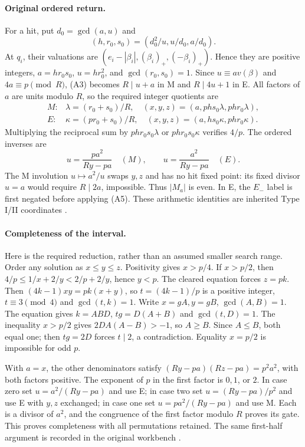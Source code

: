 \paragraph{Original ordered return.}
For a hit, put $d_0=\gcd(a,u)$ and
\[
 (h,r_0,s_0)=(d_0^2/u,u/d_0,a/d_0).
\]
At $q_i$, their valuations are
$(e_i-|\beta_i|,(\beta_i)_+,(-\beta_i)_+)$. Hence they are positive
integers, $a=hr_0s_0$, $u=hr_0^2$, and $\gcd(r_0,s_0)=1$.
Since $u\equiv av(\beta)$ and $4a\equiv p\pmod R$, (A3) becomes
$R\mid u+a$ in M and $R\mid4u+1$ in E. All factors of $a$ are units
modulo $R$, so the required integer quotients are
\[
 \begin{array}{ll}
 M:&\lambda=(r_0+s_0)/R,\quad (x,y,z)=(a,phs_0\lambda,phr_0\lambda),\\
 E:&\kappa=(pr_0+s_0)/R,\quad (x,y,z)=(a,hs_0\kappa,phr_0\kappa).
 \end{array}                                                   \tag{A5}
\]
Multiplying the reciprocal sum by $phr_0s_0\lambda$ or
$phr_0s_0\kappa$ verifies $4/p$. The ordered inverses are
\[
 u=\frac{pa^2}{Ry-pa}\quad(M),\qquad
 u=\frac{a^2}{Ry-pa}\quad(E).                              \tag{A6}
\]
The M involution $u\mapsto a^2/u$ swaps $y,z$ and has no hit fixed point:
its fixed divisor $u=a$ would require $R\mid2a$, impossible. Thus $|M_a|$
is even. In E, the $E_-$ label is first negated before applying (A5).
These arithmetic identities are inherited Type I/II coordinates
\cite[\S2, Propositions 2.2 and 2.6]{ET}.

\paragraph{Completeness of the interval.}
Here is the required reduction, rather than an assumed smaller search range.
Order any solution as $x\le y\le z$. Positivity gives $x>p/4$.
If $x>p/2$, then $4/p\le1/x+2/y<2/p+2/y$, hence $y<p$.
The cleared equation forces $z=pk$. Then $(4k-1)xy=pk(x+y)$,
so $t=(4k-1)/p$ is a positive integer, $t\equiv3\pmod4$ and
$\gcd(t,k)=1$. Write $x=gA,y=gB$, $\gcd(A,B)=1$.
The equation gives $k=ABD$, $tg=D(A+B)$ and $\gcd(t,D)=1$.
The inequality $x>p/2$ gives $2DA(A-B)>-1$, so $A\ge B$.
Since $A\le B$, both equal one; then $tg=2D$ forces $t\mid2$, a
contradiction. Equality $x=p/2$ is impossible for odd $p$.

With $a=x$, the other denominators satisfy
$(Ry-pa)(Rz-pa)=p^2a^2$, with both factors positive. The exponent of $p$
in the first factor is $0,1$, or $2$. In case zero set
$u=a^2/(Ry-pa)$ and use E; in case two set $u=(Ry-pa)/p^2$ and
use E with $y,z$ exchanged; in case one set $u=pa^2/(Ry-pa)$ and
use M. Each is a divisor of $a^2$, and the congruence of the first factor
modulo $R$ proves its gate. This proves completeness with all permutations
retained. The same first-half argument is recorded in the original
workbench \cite[Theorem \texttt{bp-first-half}]{Prior}.

